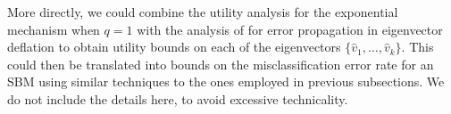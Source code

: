 \documentclass{article}
\begin{document}

More directly, we could combine the utility analysis for the exponential mechanism when $q=1$ with the analysis of \cite{LiaEtal24} for error propagation in eigenvector deflation to obtain utility bounds on each of the eigenvectors $\{\hat{v}_1, \dots, \hat{v}_k\}$. This could then be translated into bounds on the misclassification error rate for an SBM using similar techniques to the ones employed in previous subsections. We do not include the details here, to avoid excessive technicality.

\end{document}
